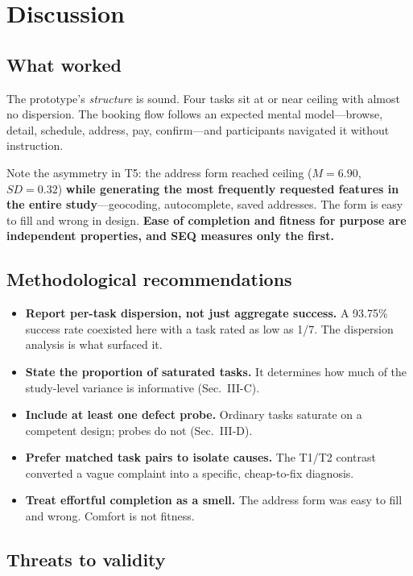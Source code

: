 \documentclass[conference]{IEEEtran}
\begin{document}
\section{Discussion}

\subsection{What worked}

The prototype's \emph{structure} is sound. Four tasks sit at or near ceiling
with almost no dispersion. The booking flow follows an expected mental
model---browse, detail, schedule, address, pay, confirm---and participants
navigated it without instruction.

Note the asymmetry in T5: the address form reached ceiling ($M=6.90$,
$SD=0.32$) \textbf{while generating the most frequently requested features in
the entire study}---geocoding, autocomplete, saved addresses. The form is easy
to fill and wrong in design. \textbf{Ease of completion and fitness for purpose
are independent properties, and SEQ measures only the first.}

\subsection{Methodological recommendations}

\begin{itemize}
\item \textbf{Report per-task dispersion, not just aggregate success.} A
93.75\% success rate coexisted here with a task rated as low as 1/7. The
dispersion analysis is what surfaced it.
\item \textbf{State the proportion of saturated tasks.} It determines how much
of the study-level variance is informative (Sec.~III-C).
\item \textbf{Include at least one defect probe.} Ordinary tasks saturate on a
competent design; probes do not (Sec.~III-D).
\item \textbf{Prefer matched task pairs to isolate causes.} The T1/T2 contrast
converted a vague complaint into a specific, cheap-to-fix diagnosis.
\item \textbf{Treat effortful completion as a smell.} The address form was easy
to fill and wrong. Comfort is not fitness.
\end{itemize}

\subsection{Threats to validity}
\end{document}
